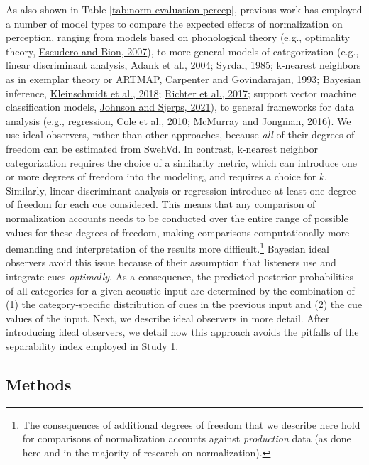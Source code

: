 \documentclass[utf8]{frontiersSCNS}
\begin{document}
As also shown in Table \ref{tab:norm-evaluation-percep}, previous work has employed a number of model types to compare the expected effects of normalization on perception, ranging from models based on phonological theory (e.g., optimality theory, \protect\hyperlink{ref-escudero2007}{Escudero and Bion, 2007}), to more general models of categorization (e.g., linear discriminant analysis, \protect\hyperlink{ref-adank2004}{Adank et al., 2004}; \protect\hyperlink{ref-syrda1985}{Syrdal, 1985}; k-nearest neighbors as in exemplar theory or ARTMAP, \protect\hyperlink{ref-carpenter1993}{Carpenter and Govindarajan, 1993}; Bayesian inference, \protect\hyperlink{ref-Kleinschmidt2018}{Kleinschmidt et al., 2018}; \protect\hyperlink{ref-richter2017}{Richter et al., 2017}; support vector machine classification models, \protect\hyperlink{ref-johnson-sjerps2021}{Johnson and Sjerps, 2021}), to general frameworks for data analysis (e.g., regression, \protect\hyperlink{ref-cole2010}{Cole et al., 2010}; \protect\hyperlink{ref-mcmurray-jongman2016}{McMurray and Jongman, 2016}). We use ideal observers, rather than other approaches, because \emph{all} of their degrees of freedom can be estimated from SwehVd. In contrast, k-nearest neighbor categorization requires the choice of a similarity metric, which can introduce one or more degrees of freedom into the modeling, and requires a choice for \(k\). Similarly, linear discriminant analysis or regression introduce at least one degree of freedom for each cue considered. This means that any comparison of normalization accounts needs to be conducted over the entire range of possible values for these degrees of freedom, making comparisons computationally more demanding and interpretation of the results more difficult.\footnote{The consequences of additional degrees of freedom that we describe here hold for comparisons of normalization accounts against \emph{production} data (as done here and in the majority of research on normalization).} Bayesian ideal observers avoid this issue because of their assumption that listeners use and integrate cues \emph{optimally}. As a consequence, the predicted posterior probabilities of all categories for a given acoustic input are determined by the combination of (1) the category-specific distribution of cues in the previous input and (2) the cue values of the input. Next, we describe ideal observers in more detail. After introducing ideal observers, we detail how this approach avoids the pitfalls of the separability index employed in Study 1.

\hypertarget{sec:methodsII}{%
\subsection*{Methods}\label{sec:methodsII}}
\end{document}
